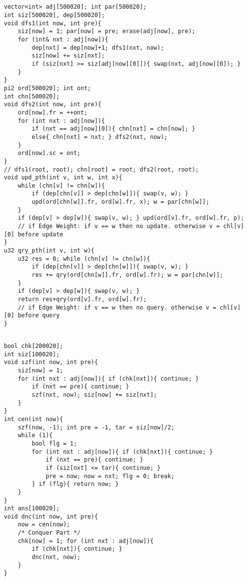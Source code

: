 \documentclass[landscape, 8pt, a4paper, oneside, twocolumn]{extarticle}
\begin{document}
\subsection{}
\begin{verbatim}
vector<int> adj[500020]; int par[500020];
int siz[500020], dep[500020];
void dfs1(int now, int pre){
    siz[now] = 1; par[now] = pre; erase(adj[now], pre);
    for (int& nxt : adj[now]){
        dep[nxt] = dep[now]+1; dfs1(nxt, now);
        siz[now] += siz[nxt];
        if (siz[nxt] >= siz[adj[now][0]]){ swap(nxt, adj[now][0]); }
    }
}
pi2 ord[500020]; int ont;
int chn[500020];
void dfs2(int now, int pre){
    ord[now].fr = ++ont;
    for (int nxt : adj[now]){
        if (nxt == adj[now][0]){ chn[nxt] = chn[now]; }
        else{ chn[nxt] = nxt; } dfs2(nxt, now);
    }
    ord[now].sc = ont;
}
// dfs1(root, root); chn[root] = root; dfs2(root, root);
void upd_pth(int v, int w, int x){
    while (chn[v] != chn[w]){
        if (dep[chn[v]] > dep[chn[w]]){ swap(v, w); }
        upd(ord[chn[w]].fr, ord[w].fr, x); w = par[chn[w]];
    }
    if (dep[v] > dep[w]){ swap(v, w); } upd(ord[v].fr, ord[w].fr, p);
    // if Edge Weight: if v == w then no update. otherwise v = chl[v][0] before update
}
u32 qry_pth(int v, int w){
    u32 res = 0; while (chn[v] != chn[w]){
        if (dep[chn[v]] > dep[chn[w]]){ swap(v, w); }
        res += qry(ord[chn[w]].fr, ord[w].fr); w = par[chn[w]];
    }
    if (dep[v] > dep[w]){ swap(v, w); }
    return res+qry(ord[v].fr, ord[w].fr);
    // if Edge Weight: if v == w then no query. otherwise v = chl[v][0] before query
}
\end{verbatim}
\subsection{}
\begin{verbatim}
bool chk[200020];
int siz[100020];
void szf(int now, int pre){
    siz[now] = 1;
    for (int nxt : adj[now]){ if (chk[nxt]){ continue; }
        if (nxt == pre){ continue; }
        szf(nxt, now); siz[now] += siz[nxt];
    }
}
int cen(int now){
    szf(now, -1); int pre = -1, tar = siz[now]/2;
    while (1){
        bool flg = 1;
        for (int nxt : adj[now]){ if (chk[nxt]){ continue; }
            if (nxt == pre){ continue; }
            if (siz[nxt] <= tar){ continue; }
            pre = now; now = nxt; flg = 0; break;
        } if (flg){ return now; }
    }
}
int ans[100020];
void dnc(int now, int pre){
    now = cen(now);
    /* Conquer Part */
    chk[now] = 1; for (int nxt : adj[now]){
        if (chk[nxt]){ continue; }
        dnc(nxt, now);
    }
}
\end{verbatim}
\end{document}
